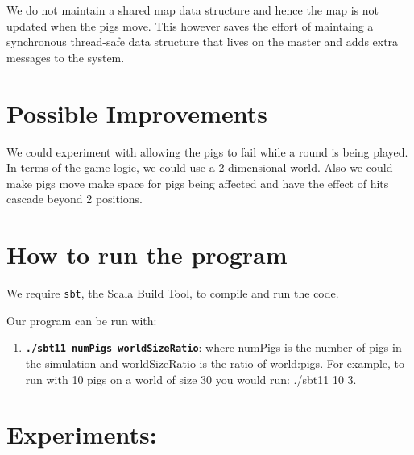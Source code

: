 \documentclass[]{article}
\begin{document}
We do not maintain a shared map data structure and hence the map is not updated
when the pigs move. This however saves the effort of maintaing a synchronous
thread-safe data structure that lives on the master and adds extra messages to
the system.

\section{Possible Improvements}

We could experiment with allowing the pigs to fail while a round is being played. 
In terms of the game logic, we could use a 2
dimensional world. Also we could make pigs move make space for pigs
being affected and have the effect of hits cascade beyond 2 positions.

\section{How to run the program}

We require \texttt{sbt}, the Scala Build Tool, to compile and run the code.

Our program can be run with:

\begin{enumerate}[1.]
\item
  \textbf{\texttt{./sbt11 numPigs worldSizeRatio}}: where numPigs is the number of pigs in the simulation and worldSizeRatio is the ratio of world:pigs. For example, to run with 10 pigs on a world of size 30 you would run: ./sbt11 10 3.
\end{enumerate}

\section{Experiments:}

\pagebreak
\end{document}
